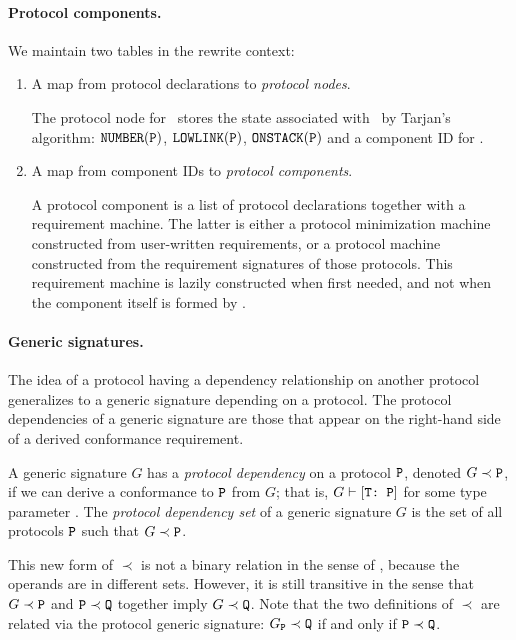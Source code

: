 \documentclass[../generics]{subfiles}
\begin{document}
\paragraph{Protocol components.} We maintain two tables in the rewrite context:
\begin{enumerate}
\item A map from protocol declarations to \emph{protocol nodes}.

The protocol node for \tP\ stores the state associated with \tP\ by Tarjan's algorithm: $\texttt{NUMBER}(\texttt{P})$, $\texttt{LOWLINK}(\texttt{P})$, $\texttt{ONSTACK}(\texttt{P})$ and a component ID for \tP.
\item A map from component IDs to \emph{protocol components}.

A protocol component is a list of protocol declarations together with a requirement machine. The latter is either a protocol minimization machine constructed from user-written requirements, or a protocol machine constructed from the requirement signatures of those protocols. This requirement machine is lazily constructed when first needed, and not when the component itself is formed by .
\end{enumerate}

\paragraph{Generic signatures.}
The idea of a protocol having a dependency relationship on another protocol generalizes to a generic signature depending on a protocol. The protocol dependencies of a generic signature are those that appear on the right-hand side of a derived conformance requirement.

\begin{definition}
A generic signature $G$ has a \emph{protocol dependency} on a protocol $\texttt{P}$, denoted \index{$\prec$}$G\prec\texttt{P}$, if we can derive a conformance to $\texttt{P}$ from $G$; that is, $G\vdash[\texttt{T:~P}]$ for some type parameter \tT. The \emph{protocol dependency set} of a generic signature $G$ is the set of all protocols $\texttt{P}$ such that $G\prec\texttt{P}$.

\end{definition}

This new form of $\prec$ is not a binary relation in the sense of , because the operands are in different sets. However, it is still transitive in the sense that $G\prec\texttt{P}$ and $\texttt{P}\prec\texttt{Q}$ together imply $G\prec\texttt{Q}$. Note that the two definitions of $\prec$ are related via the protocol generic signature: $G_{\texttt{P}}\prec\texttt{Q}$ if and only if $\texttt{P}\prec\texttt{Q}$.
\end{document}
